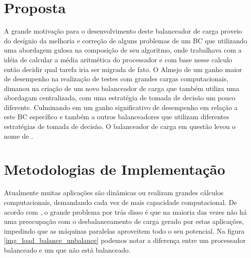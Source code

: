 \section{Proposta}
A grande motivação para o desenvolvimento deste balanceador de carga proveio do desígnio da melhoria e correção de alguns problemas de um BC que utilizando uma abordagem gulosa na composição de seu algoritmo, onde trabalhava com a idéia de calcular a média aritmética do processador e com base nesse calculo então decidir qual tarefa iria ser migrada de fato. O Almejo de um ganho maior de desempenho na realização de testes com grandes cargas computacionais, dimanou na criação de um novo balanceador de carga que também utiliza uma abordagam centralizada, com uma estratégia de tomada de decisão um pouco diferente. Culminando em um ganho significativo de desempenho em relação a este BC específico e também a outros balanceadores que utilizam diferentes estratégias de tomada de decisão. O balanceador de carga em questão levou o nome de \newlb.    


\section{Metodologias de Implementação}

Atualmente muitas aplicações são dinâmicas ou realizam grandes cálculos computacionais, demandando cada vez de mais capacidade computacional. De acordo com \cite{padoin2014saving}, o grande problema por trás disso é que na maioria das vezes não há uma preocupação com o desbalanceamento de carga gerado por estas aplicações, impedindo que as máquinas paralelas aproveitem todo o seu potencial. Na figura \ref{img_load_balance_unbalance} podemos notar a diferença entre um processador balanceado e um que não está balanceado.

